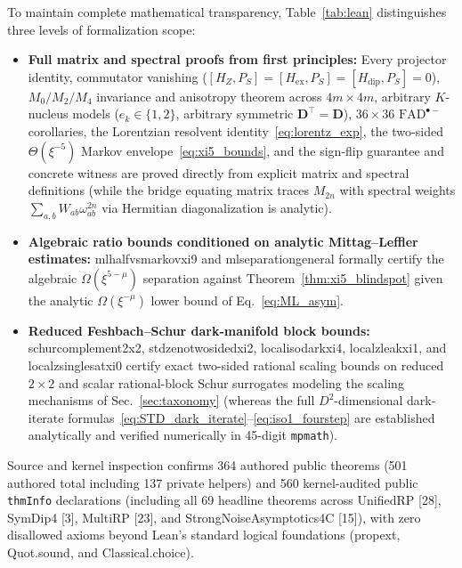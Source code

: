 \documentclass[twocolumn,10pt,amsmath,amssymb,floatfix]{revtex4-2}
\theoremstyle{plain}
\theoremstyle{definition}
\newcommand{\PS}{P_S}
\newcommand{\HZ}{H_Z}
\newcommand{\Hex}{H_{\mathrm{ex}}}
\newcommand{\Hdip}{H_{\mathrm{dip}}}
\newcommand{\leanid}[1]{{\footnotesize\ttfamily\def\_{\textunderscore\allowbreak}#1}}
\begin{document}
To maintain complete mathematical transparency, Table~\ref{tab:lean} distinguishes three levels of formalization scope:
\begin{itemize}[leftmargin=1.4em,itemsep=0.5pt,topsep=2pt,parsep=0pt]
\item \textbf{Full matrix and spectral proofs from first principles:} Every projector identity, commutator vanishing ($[\HZ,\PS]=[\Hex,\PS]=[\Hdip,\PS]=0$), $M_0/M_2/M_4$ invariance and anisotropy theorem across $4m\times 4m$, arbitrary $K$-nucleus models ($e_k \in \{1,2\}$, arbitrary symmetric $\mathbf{D}^\top=\mathbf{D}$), $36\times 36$ $\mathrm{FAD}^{\bullet-}$ corollaries, the Lorentzian resolvent identity~\eqref{eq:lorentz_exp}, the two-sided $\Theta(\xi^{-5})$ Markov envelope~\eqref{eq:xi5_bounds}, and the sign-flip guarantee and concrete witness are proved directly from explicit matrix and spectral definitions (while the bridge equating matrix traces $M_{2n}$ with spectral weights $\sum_{a,b} W_{ab}\omega_{ab}^{2n}$ via Hermitian diagonalization is analytic).
\item \textbf{Algebraic ratio bounds conditioned on analytic Mittag--Leffler estimates:} \leanid{ml\_half\_vs\_markov\_xi9\_2} and \leanid{ml\_separation\_general} formally certify the algebraic $\Omega(\xi^{5-\mu})$ separation against Theorem~\ref{thm:xi5_blindspot} given the analytic $\Omega(\xi^{-\mu})$ lower bound of Eq.~\eqref{eq:ML_asym}.
\item \textbf{Reduced Feshbach--Schur dark-manifold block bounds:} \leanid{schur\_complement\_2x2}, \leanid{std\_zeno\_two\_sided\_xi2}, \leanid{local\_iso\_dark\_xi4}, \leanid{local\_z\_leak\_xi1}, and \leanid{local\_z\_single\_sat\_xi0} certify exact two-sided rational scaling bounds on reduced $2\times 2$ and scalar rational-block Schur surrogates modeling the scaling mechanisms of Sec.~\ref{sec:taxonomy} (whereas the full $D^2$-dimensional dark-iterate formulas~\eqref{eq:STD_dark_iterate}--\eqref{eq:iso1_fourstep} are established analytically and verified numerically in 45-digit \texttt{mpmath}).
\end{itemize}
Source and kernel inspection confirms 364 authored public theorems (501 authored total including 137 private helpers) and 560 kernel-audited public \texttt{thmInfo} declarations (including all 69 headline theorems across \leanid{UnifiedRP} [28], \leanid{SymDip4} [3], \leanid{MultiRP} [23], and \leanid{StrongNoiseAsymptotics4C} [15]), with zero disallowed axioms beyond Lean's standard logical foundations (\leanid{propext}, \leanid{Quot.sound}, and \leanid{Classical.choice}).
\end{document}
